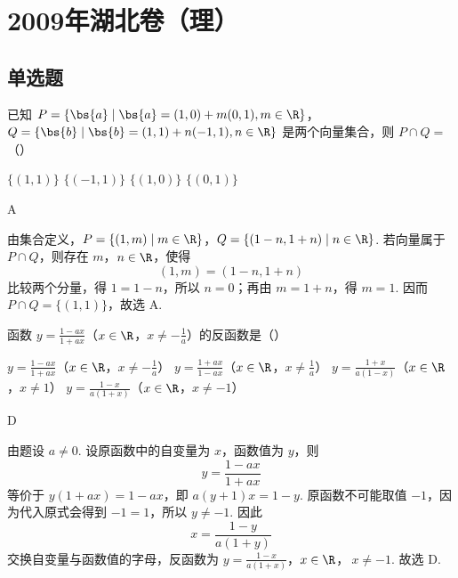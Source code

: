 \chapter{2009年湖北卷（理）}

\section{单选题}

\begin{problem}
已知 \(P = \{\bs{a} \mid \bs{a} = (1,0) + m(0,1), m \in \R\}\)，\(Q = \{\bs{b} \mid \bs{b} = (1,1) + n(-1,1), n \in \R\}\) 是两个向量集合，则 \(P \cap Q =\)（\quad）

\choices
    {\(\{(1,1)\}\)}
    {\(\{(-1,1)\}\)}
    {\(\{(1,0)\}\)}
    {\(\{(0,1)\}\)}
\end{problem}

\begin{answer}
A
\end{answer}

\begin{solution}
由集合定义，\(P=\{(1,m)\mid m\in\R\}\)，\(Q=\{(1-n,1+n)\mid n\in\R\}\). 若向量属于 \(P\cap Q\)，则存在 \(m\)，\(n\in\R\)，使得
\[
(1,m)=(1-n,1+n)
\]
比较两个分量，得 \(1=1-n\)，所以 \(n=0\)；再由 \(m=1+n\)，得 \(m=1\). 因而 \(P\cap Q=\{(1,1)\}\)，故选 A.
\end{solution}

\begin{problem}
函数 \( y = \frac{1 - ax}{1 + ax} \)（\(x \in \R\)，\(x \neq -\frac{1}{a}\)）的反函数是（\quad）

\choices
    {\( y = \frac{1 - ax}{1 + ax} \)（\(x \in \R\)，\(x \neq -\frac{1}{a}\)）}
    {\( y = \frac{1 + ax}{1 - ax} \)（\(x \in \R\)，\(x \neq \frac{1}{a}\)）}
    {\( y = \frac{1 + x}{a(1 - x)} \)（\(x \in \R\)，\(x \neq 1\)）}
    {\( y = \frac{1 - x}{a(1 + x)} \)（\(x \in \R\)，\(x \neq -1\)）}
\end{problem}

\begin{answer}
D
\end{answer}

\begin{solution}
由题设 \(a\ne0\). 设原函数中的自变量为 \(x\)，函数值为 \(y\)，则
\[
y=\frac{1-ax}{1+ax}
\]
等价于 \(y(1+ax)=1-ax\)，即 \(a(y+1)x=1-y\). 原函数不可能取值 \(-1\)，因为代入原式会得到 \(-1=1\)，所以 \(y\ne-1\). 因此
\[
x=\frac{1-y}{a(1+y)}
\]
交换自变量与函数值的字母，反函数为
\(y=\frac{1-x}{a(1+x)}\)，\(x\in\R\)，\(\ x\ne-1\).
故选 D.
\end{solution}

